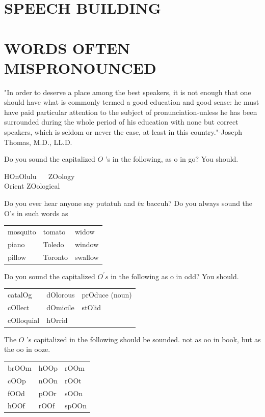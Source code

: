 \documentclass[10pt]{article}
\begin{document}
\section*{SPEECH BUILDING}
\section*{WORDS OFTEN MISPRONOUNCED}
"In order to deserve a place among the best speakers, it is not enough that one should have what is commonly termed a good education and good sense: he must have paid particular attention to the subject of pronunciation-unless he has been surrounded during the whole period of his education with none but correct speakers, which is seldom or never the case, at least in this country."-Joseph Thomas, M.D., LL.D.

Do you sound the capitalized $O$ 's in the following, as o in go? You should.

\begin{displayquote}
HOnOlulu $\quad$ ZOology\\
Orient ZOological
\end{displayquote}

Do you ever hear anyone say putatuh and $t u$ baccuh? Do you always sound the O's in such words as

\begin{center}
\begin{tabular}{lll}
mosquito & tomato & widow \\
piano & Toledo & window \\
pillow & Toronto & swallow \\
\end{tabular}
\end{center}

Do you sound the capitalized $O^{\prime} s$ in the following as o in odd? You should.

\begin{center}
\begin{tabular}{lll}
catalOg & dOlorous & prOduce (noun) \\
cOllect & dOmicile & stOlid \\
cOlloquial & hOrrid &  \\
\end{tabular}
\end{center}

The $O$ 's capitalized in the following should be sounded. not as oo in book, but as the oo in ooze.

\begin{center}
\begin{tabular}{lll}
brOOm & hOOp & rOOm \\
cOOp & nOOn & rOOt \\
fOOd & pOOr & sOOn \\
hOOf & rOOf & spOOn \\
\end{tabular}
\end{center}
\end{document}
